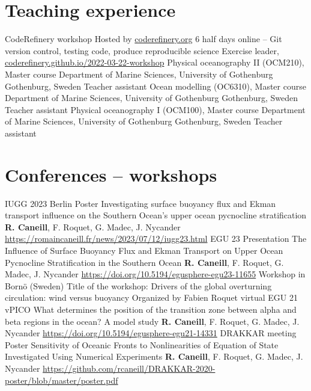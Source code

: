 \documentclass[11pt,a4paper,roman]{moderncv}
\begin{document}
\section{Teaching experience}
        {CodeRefinery workshop}
        {Hosted by \href{https://coderefinery.org}{coderefinery.org}}
        {6 half days online -- Git version control, testing code, produce reproducible science}
        {Exercise leader, \href{https://coderefinery.github.io/2022-03-22-workshop}{coderefinery.github.io/2022-03-22-workshop}}
        {}
        {Physical oceanography II (OCM210), Master course}
        {Department of Marine Sciences, University of Gothenburg}
        {Gothenburg, Sweden}
        {Teacher assistant}
        {}
        {Ocean modelling (OC6310), Master course}
        {Department of Marine Sciences, University of Gothenburg}
        {Gothenburg, Sweden}
        {Teacher assistant}
        {}
        {Physical oceanography I (OCM100), Master course}
        {Department of Marine Sciences, University of Gothenburg}
        {Gothenburg, Sweden}
        {Teacher assistant}
        {}


\nocite{*}



\section{Conferences -- workshops}
        {IUGG 2023 Berlin}
        {Poster}
        {Investigating surface buoyancy flux and Ekman transport influence on the Southern Ocean's upper ocean pycnocline stratification}
        {\textbf{R. Caneill}, F. Roquet, G. Madec, J. Nycander}
        {\href{https://romaincaneill.fr/news/2023/07/12/iugg23.html}{https://romaincaneill.fr/news/2023/07/12/iugg23.html}}
        {EGU 23}
        {Presentation}
        {The Influence of Surface Buoyancy Flux and Ekman Transport on Upper Ocean Pycnocline Stratification in the Southern Ocean}
        {\textbf{R. Caneill}, F. Roquet, G. Madec, J. Nycander}
        {\href{https://doi.org/10.5194/egusphere-egu23-11655}{https://doi.org/10.5194/egusphere-egu23-11655}}
        {Workshop in Bornö (Sweden)}
        {Title of the workshop:
        Drivers of the global overturning circulation: wind versus buoyancy}
        {Organized by Fabien Roquet}
        {}{}
        {virtual EGU 21}
        {vPICO}
        {What determines the position of the transition zone between alpha and beta regions in the ocean? A model study}
        {\textbf{R. Caneill}, F. Roquet, G. Madec, J. Nycander}
        {\href{https://doi.org/10.5194/egusphere-egu21-14331}{https://doi.org/10.5194/egusphere-egu21-14331}}
        {DRAKKAR meeting}
        {Poster}
        {Sensitivity of Oceanic Fronts to Nonlinearities of Equation of State Investigated Using Numerical Experiments}
        {\textbf{R. Caneill}, F. Roquet, G. Madec, J. Nycander}
        {\href{https://github.com/rcaneill/DRAKKAR-2020-poster/blob/master/poster.pdf}{https://github.com/rcaneill/DRAKKAR-2020-poster/blob/master/poster.pdf}}
\end{document}
